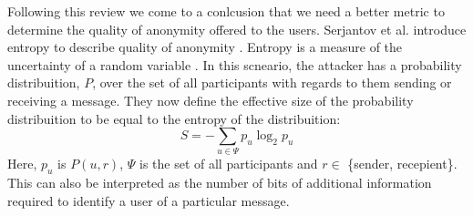 Following this review we come to a conlcusion that we need a better metric to determine the quality of anonymity offered to the users. Serjantov et al. introduce entropy to describe quality of anonymity \cite{andreiInformation}. Entropy is a measure of the uncertainty of a random variable \cite{shannon}. In this scneario, the attacker has a probability distribuition, $P$, over the set of all participants with regards to them sending or receiving a message. They now define the effective size of the probability distribuition to be equal to the entropy of the distribuition: 
\begin{equation}
    \label{eq:entropy}
    S = -\sum_{u \in \Psi} p_u \log_2 p_u
\end{equation}
Here, $p_u$ is $P(u, r)$, $\Psi$ is the set of all participants and $r \in$ \{sender, recepient\}. This can also be interpreted as the number of bits of additional information required to identify a user of a particular message.



